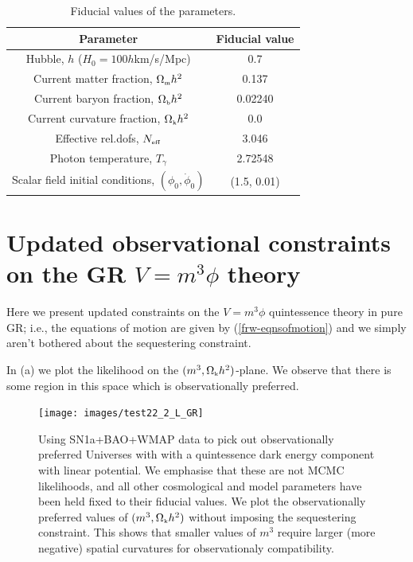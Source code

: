 \documentclass[amsmath,amssymb,10pt,twocolumn,eqsecnum]{revtex4}
\begin{document}
{\renewcommand{\arraystretch}{1.4}
\begin{table}%
\begin{center}
\begin{tabular}{||c |  c ||}
\hline
\textbf{Parameter} & \textbf{Fiducial value} \\
\hline
Hubble, $h$ ($H_0 = 100h$km/s/Mpc) & 0.7 \\\hline
Current matter fraction, ${\Omega}_{\scriptscriptstyle{\textrm{m}}}h^2$ &0.137  \\\hline
Current baryon fraction, ${\Omega}_{\scriptscriptstyle{\textrm{b}}}h^2$ &0.02240  \\\hline
Current curvature fraction, ${\Omega}_{\scriptscriptstyle{\textrm{k}}}h^2$ &0.0 \\\hline
Effective rel.dofs, ${N}_{\scriptscriptstyle{\textrm{eff}}}$ &3.046 \\\hline
Photon temperature, $T_{\gamma}$ & 2.72548 \\\hline\hline
Scalar field initial conditions, $(\phi_0, \dot{\phi}_0)$ &(1.5, 0.01) \\\hline
\end{tabular}\caption{Fiducial values of the parameters.}\label{tab:fid_params}
\end{center}
\end{table}
}

 
\section{Updated observational constraints on the GR $V = m^3\phi$ theory}
Here we present updated constraints on the  $V = m^3\phi$ quintessence theory in pure GR; i.e., the equations of motion are given by (\ref{frw-eqnsofmotion}) and we simply aren't bothered about the sequestering constraint.

In (a) we plot the likelihood on the $(m^3, {\Omega}_{\scriptscriptstyle{\textrm{k}}}h^2)$-plane. We observe that there is some region in this space which is observationally preferred. 

\begin{figure}[!t]
      \begin{center}
{\texttt{[image: images/test22\_2\_L\_GR]}}
      \end{center}
\caption{Using  SN1a+BAO+WMAP data   to pick out observationally preferred        Universes with with a quintessence dark energy component with linear potential. We emphasise that these are not MCMC likelihoods, and all other cosmological and model parameters have been held fixed to their fiducial values. We plot the observationally preferred values of $(m^3, {\Omega}_{\scriptscriptstyle{\textrm{k}}}h^2)$ without imposing the sequestering constraint. This shows that smaller values of $m^3$ require larger (more negative) spatial curvatures for observationaly compatibility.   }\label{fig:plots-like}
\end{figure}
\end{document}
